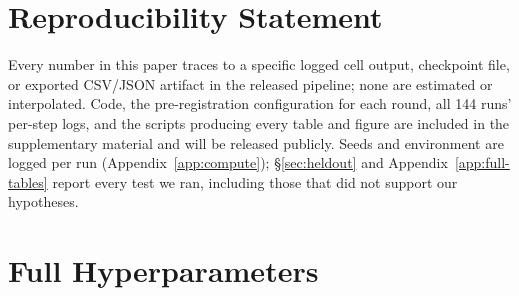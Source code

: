 \documentclass{article}
\begin{document}
\section*{Reproducibility Statement}
Every number in this paper traces to a specific logged cell output,
checkpoint file, or exported CSV/JSON artifact in the released pipeline; none
are estimated or interpolated. Code, the pre-registration configuration for
each round, all 144 runs' per-step logs, and the scripts producing every
table and figure are included in the supplementary material and will be
released publicly. Seeds and environment are logged per run
(Appendix~\ref{app:compute}); \S\ref{sec:heldout} and
Appendix~\ref{app:full-tables} report every test we ran, including those that
did not support our hypotheses.




\appendix

\section{Full Hyperparameters}
\label{app:hyperparams}
\end{document}
